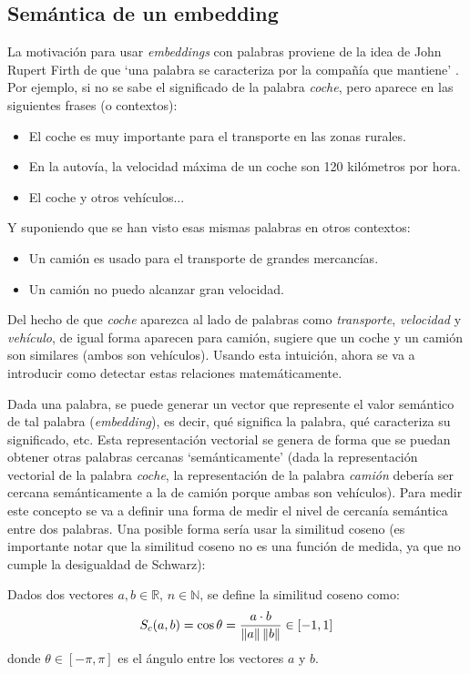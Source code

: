 \subsection*{Semántica de un embedding}

La motivación para usar \textit{embeddings} con palabras proviene de la idea de John Rupert
Firth de que `una palabra se caracteriza por la compañía que mantiene' \cite{firth1957synopsis}. Por ejemplo, si no se sabe
el significado de la palabra \textit{coche}, pero aparece en las siguientes frases (o contextos):
\begin{itemize}
    \item El coche es muy importante para el transporte en las zonas rurales.
    \item En la autovía, la velocidad máxima de un coche son 120 kilómetros por hora.
    \item El coche y otros vehículos...
\end{itemize}
Y suponiendo que se han visto esas mismas palabras en otros contextos:
\begin{itemize}
    \item Un camión es usado para el transporte de grandes mercancías.
    \item Un camión no puedo alcanzar gran velocidad.
\end{itemize}
Del hecho de que \textit{coche} aparezca al lado de palabras como \textit{transporte}, \textit{velocidad} y \textit{vehículo},
de igual forma aparecen para camión, sugiere que un coche y un camión son similares (ambos son vehículos). Usando esta intuición,
ahora se va a introducir como detectar estas relaciones matemáticamente.


Dada una palabra, se puede generar un vector que represente el valor semántico de tal palabra (\textit{embedding}), es decir, qué significa la palabra, qué caracteriza
su significado, etc. Esta representación vectorial se genera de forma que se puedan obtener otras palabras
cercanas `semánticamente' (dada la representación vectorial de la palabra \textit{coche}, la representación de la palabra \textit{camión}
debería ser cercana semánticamente a la de camión porque ambas son vehículos). Para medir este concepto se va a definir una forma de medir el nivel
de cercanía semántica entre dos palabras. Una posible forma sería usar la similitud coseno (es importante notar que la similitud coseno no es una función de medida,
ya que no cumple la desigualdad de Schwarz):

\begin{definition}
  Dados dos vectores $a,b\in\mathbb{R}$, $n\in\mathbb{N}$, se define la similitud coseno como:
  \[
    S_c(a,b)=\cos\theta = \frac{a\cdot b}{\left\lVert a\right\rVert\left\lVert b\right\rVert} \in [-1, 1]
  \]
donde $\theta\in[-\pi,\pi]$ es el ángulo entre los vectores $a$ y $b$.
\end{definition}

